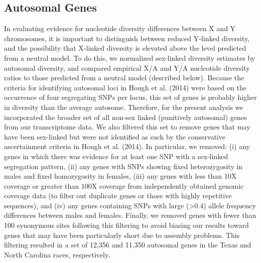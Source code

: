 \documentclass[9pt,twocolumn,twoside]{gsajnl}
\begin{document}
\subsection*{Autosomal Genes}
In evaluating evidence for nucleotide diversity differences between X and Y chromosomes, it is important to distinguish between reduced Y-linked diversity, and the possibility that X-linked diversity is elevated above the level predicted from a neutral model. To do this, we normalized sex-linked diversity estimates by autosomal diversity, and compared empirical X/A and Y/A nucleotide diversity ratios to those predicted from a neutral model (described below). Because the criteria for identifying autosomal loci in Hough et al. (2014) were based on the occurrence of four segregating SNPs per locus, this set of genes is probably higher in diversity than the average autosome. Therefore, for the present analysis we incorporated the broader set of all non-sex linked (punitively autosomal) genes from our transcriptome data. We also filtered this set to remove genes that may have been sex-linked but were not identified as such by the conservative ascertainment criteria in Hough et al. (2014). In particular, we removed: (i) any genes in which there was evidence for at least one SNP with a sex-linked segregation pattern, (ii) any genes with SNPs showing fixed heterozygosity in males and fixed homozygosity in females, (iii) any genes with less than 10X coverage or greater than 100X coverage from independently obtained genomic coverage data (to filter out duplicate genes or those with highly repetitive sequences), and (iv) any genes containing SNPs with large (>0.4) allele frequency differences between males and females. Finally, we removed genes with fewer than 100 synonymous sites following this filtering to avoid biasing our results toward genes that may have been particularly short due to assembly problems. This filtering resulted in a set of 12,356 and 11,350 autosomal genes in the Texas and North Carolina races, respectively.
\end{document}
